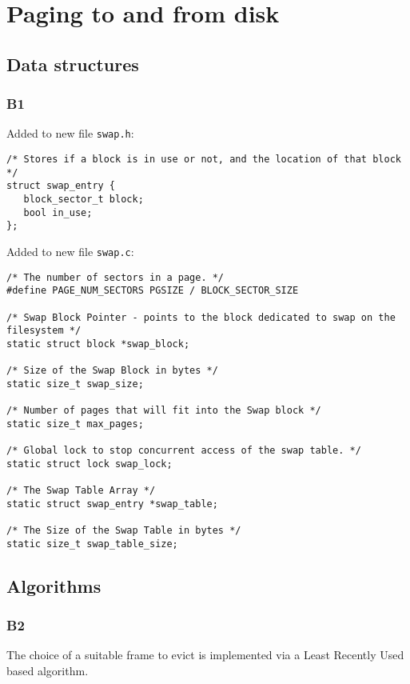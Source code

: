 \documentclass[a4wide, 11pt]{article}
\newcommand{\tx}{\texttt}
\begin{document}
\section{Paging to and from disk}

\subsection{Data structures}
\subsubsection{B1}

Added to new file \tx{swap.h}:
\begin{verbatim}
/* Stores if a block is in use or not, and the location of that block */
struct swap_entry {
   block_sector_t block;
   bool in_use;
};
\end{verbatim}

Added to new file \tx{swap.c}:
\begin{verbatim}
/* The number of sectors in a page. */
#define PAGE_NUM_SECTORS PGSIZE / BLOCK_SECTOR_SIZE 

/* Swap Block Pointer - points to the block dedicated to swap on the filesystem */
static struct block *swap_block; 

/* Size of the Swap Block in bytes */
static size_t swap_size;

/* Number of pages that will fit into the Swap block */
static size_t max_pages;         

/* Global lock to stop concurrent access of the swap table. */
static struct lock swap_lock;        

/* The Swap Table Array */
static struct swap_entry *swap_table;

/* The Size of the Swap Table in bytes */
static size_t swap_table_size;
\end{verbatim}


\subsection{Algorithms}
\subsubsection{B2}
The choice of a suitable frame to evict is implemented via a Least Recently Used based algorithm.\\
\end{document}
